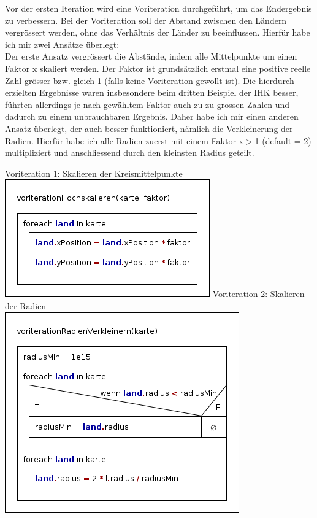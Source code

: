 \documentclass[a4paper,11pt]{article}
\begin{document}
{Vor der ersten Iteration wird eine Voriteration durchgef\"uhrt, um das Endergebnis zu verbessern. Bei der Voriteration soll der Abstand zwischen den L\"andern
vergr\"ossert werden, ohne das Verh\"altnis der L\"ander zu beeinflussen.
Hierf\"ur habe ich mir zwei Ans\"atze \"uberlegt:\\
Der erste Ansatz vergr\"ossert die Abst\"ande, indem alle Mittelpunkte um einen Faktor x skaliert werden. Der Faktor ist grunds\"atzlich erstmal eine positive reelle Zahl
gr\"osser bzw. gleich 1 (falls keine Voriteration gewollt ist). Die hierdurch erzielten Ergebnisse waren insbesondere beim dritten Beispiel der IHK besser, f\"uhrten allerdings
je nach gew\"ahltem Faktor auch zu zu grossen Zahlen und dadurch zu einem unbrauchbaren Ergebnis.
Daher habe ich mir einen anderen Ansatz \"uberlegt, der auch besser funktioniert, n\"amlich die Verkleinerung der Radien. Hierf\"ur habe ich alle Radien zuerst mit einem
Faktor x$>$1 (default = 2) multipliziert und anschliessend durch den kleinsten Radius geteilt.
\vspace{3mm}
\begin{center}
	\vbox{
		Voriteration 1: Skalieren der Kreismittelpunkte\\
		\includegraphics[width=0.6\linewidth]{voriterationHochskalieren.png}
	}
	\vspace{5mm}
	\vbox{
		Voriteration 2: Skalieren der Radien\\
		\includegraphics[width=0.6\linewidth]{voriterationRadienVerkleinern.png}
	}
\end{center}


}
\end{document}
